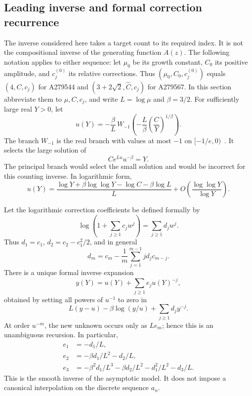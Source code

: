 \documentclass[11pt,letterpaper]{article}
\theoremstyle{remark}\newtheorem{remark}[theorem]{Remark}
\begin{document}
\subsection{Leading inverse and formal correction recurrence}
The inverse considered here takes a target count to its required index.
It is not the compositional inverse of the generating function $A(z)$.
The following notation applies to either sequence: let $\mu_0$ be its
growth constant, $C_0$ its positive amplitude, and $c_j^{(0)}$ its
relative corrections. Thus $(\mu_0,C_0,c_j^{(0)})$ equals
$(4,C,c_j)$ for A279544 and $(3+2\sqrt2,\widehat C,\widehat c_j)$
for A279567. In this section abbreviate them to $\mu,C,c_j$,
and write $L=\log\mu$ and $\beta=3/2$. For sufficiently large
real $Y>0$, let
\begin{equation}\label{ivk:orb:Wleading}
u(Y)=-\frac{\beta}{L}\,
W_{-1}\left(-\frac{L}{\beta}\left(\frac CY\right)^{1/\beta}\right).
\end{equation}
The branch $W_{-1}$ is the real branch with values at most $-1$ on
$[-1/e,0)$~\cite{lambert}. It selects the large solution of
\begin{equation}\label{ivk:orb:leadingeq}
C e^{Lu}u^{-\beta}=Y.
\end{equation}
The principal branch would select the small solution and would be
incorrect for this counting inverse. In logarithmic form,
\begin{equation}\label{ivk:orb:logleading}
u(Y)=\frac{\log Y+\beta\log\log Y-\log C-\beta\log L}{L}
+O\left(\frac{\log\log Y}{\log Y}\right).
\end{equation}

Let the logarithmic correction coefficients be defined formally by
\begin{equation}\label{ivk:orb:ddef}
\log\left(1+\sum_{j\ge1}c_jw^j\right)=\sum_{j\ge1}d_jw^j.
\end{equation}
Thus $d_1=c_1$, $d_2=c_2-c_1^2/2$, and in general
\begin{equation}\label{ivk:orb:drec}
d_m=c_m-\frac1m\sum_{j=1}^{m-1}j d_jc_{m-j}.
\end{equation}
There is a unique formal inverse expansion
\begin{equation}\label{ivk:orb:yinverse}
y(Y)=u(Y)+\sum_{j\ge1}e_j u(Y)^{-j},
\end{equation}
obtained by setting all powers of $u^{-1}$ to zero in
\begin{equation}\label{ivk:orb:erec}
L(y-u)-\beta\log(y/u)+\sum_{j\ge1}d_jy^{-j}.
\end{equation}
At order $u^{-m}$, the new unknown occurs only as $Le_m$; hence this
is an unambiguous recursion. In particular,
\begin{equation}\label{ivk:orb:e123}
\begin{aligned}
e_1&=-d_1/L,\\
e_2&=-\beta d_1/L^2-d_2/L,\\
e_3&=-\beta^2d_1/L^3-\beta d_2/L^2-d_1^2/L^2-d_3/L.
\end{aligned}
\end{equation}
This is the smooth inverse of the asymptotic model. It does not impose
a canonical interpolation on the discrete sequence $a_n$.
\end{document}
